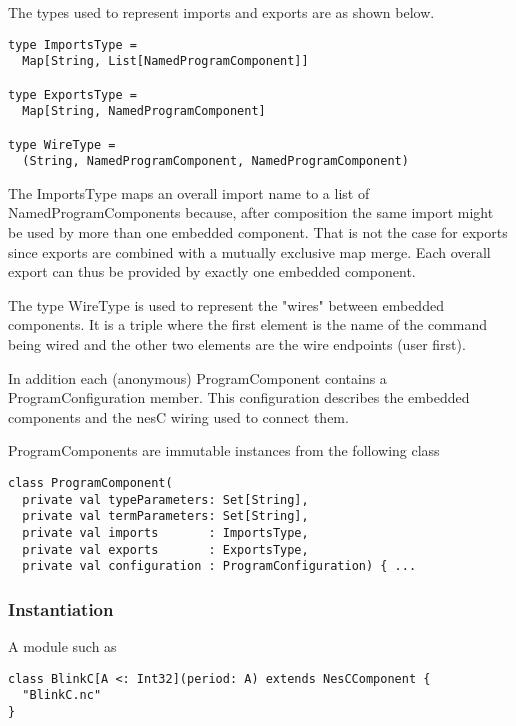 The types used to represent imports and exports are as shown below.

\singlespace
\begin{lstlisting}[language=scalaness]
type ImportsType =
  Map[String, List[NamedProgramComponent]]

type ExportsType =
  Map[String, NamedProgramComponent]

type WireType =
  (String, NamedProgramComponent, NamedProgramComponent)
\end{lstlisting}
\primaryspacing

The ImportsType maps an overall import name to a list of NamedProgramComponents because, after
composition the same import might be used by more than one embedded component. That is not the
case for exports since exports are combined with a mutually exclusive map merge. Each overall
export can thus be provided by exactly one embedded component.

The type WireType is used to represent the "wires" between embedded components. It is a triple
where the first element is the name of the command being wired and the other two elements are
the wire endpoints (user first).

In addition each (anonymous) ProgramComponent contains a ProgramConfiguration member. This
configuration describes the embedded components and the nesC wiring used to connect them.

ProgramComponents are immutable instances from the following class

\singlespace
\begin{lstlisting}[language=scalaness]
class ProgramComponent(
  private val typeParameters: Set[String],
  private val termParameters: Set[String],
  private val imports       : ImportsType,
  private val exports       : ExportsType,
  private val configuration : ProgramConfiguration) { ...
\end{lstlisting}
\primaryspacing

\subsubsection{Instantiation}
\label{section-instantiation}

A module such as

\singlespace
\begin{lstlisting}[language=scalaness]
class BlinkC[A <: Int32](period: A) extends NesCComponent {
  "BlinkC.nc"
}
\end{lstlisting}
\primaryspacing

